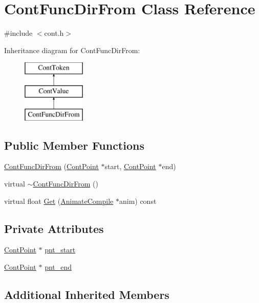 \hypertarget{a00053}{\section{Cont\-Func\-Dir\-From Class Reference}
\label{a00053}
}


{\ttfamily \#include $<$cont.\-h$>$}

Inheritance diagram for Cont\-Func\-Dir\-From\-:\begin{figure}[H]
\begin{center}
\leavevmode
\includegraphics[height=3.000000cm]{a00053}
\end{center}
\end{figure}
\subsection*{Public Member Functions}
\begin{DoxyCompactItemize}
\item 
\hyperlink{a00053_aad1f01170a3aa55f68c85d0564325005}{Cont\-Func\-Dir\-From} (\hyperlink{a00062}{Cont\-Point} $\ast$start, \hyperlink{a00062}{Cont\-Point} $\ast$end)
\item 
virtual \hyperlink{a00053_a773fd565cfb24280beacf0a916eddf2b}{$\sim$\-Cont\-Func\-Dir\-From} ()
\item 
virtual float \hyperlink{a00053_a7bf25238dce61c2810ef200764a86c8a}{Get} (\hyperlink{a00007}{Animate\-Compile} $\ast$anim) const 
\end{DoxyCompactItemize}
\subsection*{Private Attributes}
\begin{DoxyCompactItemize}
\item 
\hyperlink{a00062}{Cont\-Point} $\ast$ \hyperlink{a00053_a057385fa5f34bec3e9691e3a7a9a6b9a}{pnt\-\_\-start}
\item 
\hyperlink{a00062}{Cont\-Point} $\ast$ \hyperlink{a00053_a3d16a2d6d1a2b702c628fc988ac1d541}{pnt\-\_\-end}
\end{DoxyCompactItemize}
\subsection*{Additional Inherited Members}


